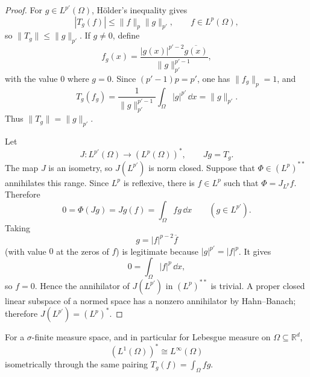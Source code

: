 \begin{proof}
For $g\in L^{p'}(\Omega)$, Hölder's inequality gives
\[
  |T_g(f)|\le\|f\|_p\|g\|_{p'},
  \qquad f\in L^p(\Omega),
\]
so $\|T_g\|\le\|g\|_{p'}$.  If $g\ne0$, define
\[
  f_g(x)=
  \frac{|g(x)|^{p'-2}\overline{g(x)}}{\|g\|_{p'}^{p'-1}},
\]
with the value $0$ where $g=0$.  Since $(p'-1)p=p'$, one has
$\|f_g\|_p=1$, and
\[
  T_g(f_g)
  =\frac{1}{\|g\|_{p'}^{p'-1}}
    \int_\Omega |g|^{p'}\,\dd x
  =\|g\|_{p'}.
\]
Thus $\|T_g\|=\|g\|_{p'}$.

Let
\[
  J\colon L^{p'}(\Omega)\longrightarrow (L^p(\Omega))^*,
  \qquad Jg=T_g.
\]
The map $J$ is an isometry, so $J(L^{p'})$ is norm closed.  Suppose that
$\Phi\in(L^p)^{**}$ annihilates this range.  Since $L^p$ is reflexive, there is
$f\in L^p$ such that $\Phi=J_{L^p}f$.  Therefore
\[
  0=\Phi(Jg)=Jg(f)=\int_\Omega fg\,\dd x
  \qquad(g\in L^{p'}).
\]
Taking
\[
  g=|f|^{p-2}\overline f
\]
(with value $0$ at the zeros of $f$) is legitimate because
$|g|^{p'}=|f|^p$.  It gives
\[
  0=\int_\Omega |f|^p\,\dd x,
\]
so $f=0$.  Hence the annihilator of $J(L^{p'})$ in $(L^p)^{**}$ is trivial.
A proper closed linear subspace of a normed space has a nonzero annihilator by
Hahn--Banach; therefore $J(L^{p'})=(L^p)^*$.
\end{proof}

\begin{notetheorem}
For a $\sigma$-finite measure space, and in particular for Lebesgue measure on
$\Omega\subseteq\mathbb R^d$,
\[
  (L^1(\Omega))^*\cong L^\infty(\Omega)
\]
isometrically through the same pairing
$T_g(f)=\int_\Omega fg$.
\end{notetheorem}

